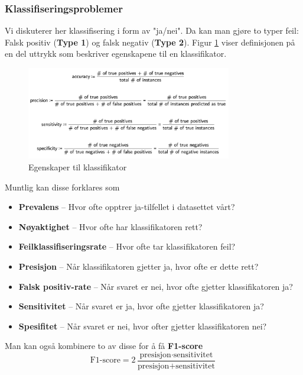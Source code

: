 \subsubsection{Klassifiseringsproblemer}
Vi diskuterer her klassifisering i form av "ja/nei". Da kan man gjøre to typer feil: Falsk positiv (\textbf{Type 1}) og falsk negativ (\textbf{Type 2}). Figur \ref{fig:klassifisering} viser definisjonen på en del uttrykk som beskriver egenskapene til en klassifikator.

\begin{figure}[h]
\centering
\includegraphics[width=0.8\textwidth]{Figurer/klassifisering.png}
\caption{Egenskaper til klassifikator}
\label{fig:klassifisering}
\end{figure}

Muntlig kan disse forklares som
\begin{itemize}
\item \textbf{Prevalens} -- Hvor ofte opptrer ja-tilfellet i datasettet vårt?
\item \textbf{Nøyaktighet} -- Hvor ofte har klassifikatoren rett?
\item \textbf{Feilklassifiseringsrate} -- Hvor ofte tar klassifikatoren feil?
\item \textbf{Presisjon} -- Når klassifikatoren gjetter ja, hvor ofte er dette rett?
\item \textbf{Falsk positiv-rate} -- Når svaret er nei, hvor ofte gjetter klassifikatoren ja?
\item \textbf{Sensitivitet} -- Når svaret er ja, hvor ofte gjetter klassifikatoren ja?
\item \textbf{Spesifitet} -- Når svaret er nei, hvor ofter gjetter klassifikatoren nei?
\end{itemize}

Man kan også kombinere to av disse for å få \textbf{F1-score}
\begin{equation}
\textrm{F1-score} = 2 \frac{\textrm{presisjon} \cdot \textrm{
sensitivitet}}{\textrm{presisjon} + \textrm{
sensitivitet}}
\end{equation}

